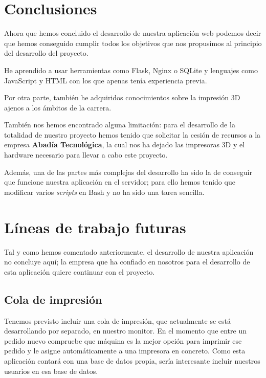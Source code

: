 
\section{Conclusiones}

Ahora que hemos concluido el desarrollo de nuestra aplicación web podemos decir que hemos conseguido cumplir todos los objetivos que nos propusimos al principio del desarrollo del proyecto.

He aprendido a usar herramientas como Flask, Nginx o SQLite y lenguajes como JavaScript y HTML con los que apenas tenía experiencia previa.

Por otra parte, también he adquiridos conocimientos sobre la impresión 3D ajenos a los ámbitos de la carrera.

También nos hemos encontrado alguna limitación: para el desarrollo de la totalidad de nuestro proyecto hemos tenido que solicitar la cesión de recursos a la empresa \textbf{Abadía Tecnológica}, la cual nos ha dejado las impresoras 3D y el hardware necesario para llevar a cabo este proyecto.

Además, una de las partes más complejas del desarrollo ha sido la de conseguir que funcione nuestra aplicación en el servidor; para ello hemos tenido que modificar varios \textit{scripts} en Bash y no ha sido una tarea sencilla.


\section{Líneas de trabajo futuras}

Tal y como hemos comentado anteriormente, el desarrollo de nuestra aplicación no concluye aquí; la empresa que ha confiado en nosotros para el desarrollo de esta aplicación quiere continuar con el proyecto.

\subsection{Cola de impresión}

Tenemos previsto incluir una cola de impresión, que actualmente se está desarrollando por separado, en nuestro monitor. En el momento que entre un pedido nuevo compruebe que máquina es la mejor opción para imprimir ese pedido y le asigne automáticamente a una impresora en concreto. Como esta aplicación contará con una base de datos propia, sería interesante incluir nuestros usuarios en esa base de datos.

